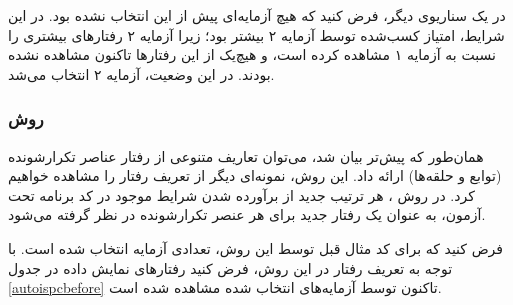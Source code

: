 در یک سناریوی دیگر، فرض کنید که هیچ آزمایه‌ای پیش از این انتخاب نشده بود. در این شرایط، امتیاز کسب‌شده توسط آزمایه ۲ بیشتر بود؛ زیرا آزمایه ۲ رفتارهای بیشتری را نسبت به آزمایه ۱ مشاهده کرده است، و هیچ‌یک از این رفتارها تاکنون مشاهده نشده بودند. در این وضعیت، آزمایه ۲ انتخاب می‌شد.


\subsubsection{روش }
همان‌طور که پیش‌تر بیان شد، می‌توان تعاریف متنوعی از رفتار عناصر تکرارشونده (توابع و حلقه‌ها) ارائه داد. این روش، نمونه‌ای دیگر از تعریف رفتار را مشاهده خواهیم کرد. در روش ، هر ترتیب جدید از برآورده شدن شرایط موجود در کد برنامه تحت آزمون، به عنوان یک رفتار جدید برای هر عنصر تکرارشونده در نظر گرفته می‌شود.


فرض کنید که برای کد مثال قبل توسط این روش، تعدادی آزمایه انتخاب شده است. با توجه به تعریف رفتار در این روش، فرض کنید رفتارهای نمایش داده در جدول \ref{autoispcbefore} تاکنون توسط آزمایه‌های انتخاب شده مشاهده شده است.

